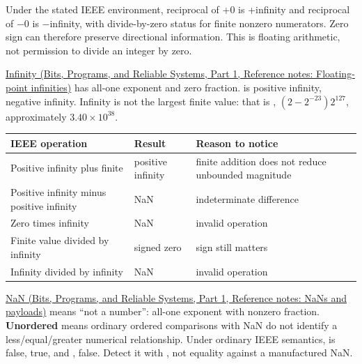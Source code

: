 Under the stated IEEE environment, reciprocal of +0 is +infinity and reciprocal of −0 is −infinity, with divide-by-zero status for finite nonzero numerators. Zero sign can therefore preserve directional information. This is floating arithmetic, not permission to divide an integer by zero.

\href{../01-Bits-Programs-and-Reliable-Systems-P01/main.pdf\#nameddest=appendix-eb336149c00a}{Infinity (Bits, Programs, and Reliable Systems, Part 1, Reference notes: Floating-point infinities)} has all-one exponent and zero fraction.  is positive infinity,  negative infinity. Infinity is not the largest finite value: that is , \((2-2^{-23})2^{127}\), approximately \(3.40\times10^{38}\).

{\def\LTcaptype{none} %
\begin{longtable}[]{@{}
  >{\raggedright\arraybackslash}p{}
  >{\raggedright\arraybackslash}p{}
  >{\raggedright\arraybackslash}p{}@{}}
\toprule\noalign{}
\begin{minipage}[b]{\linewidth}\raggedright
IEEE operation
\end{minipage} & \begin{minipage}[b]{\linewidth}\raggedright
Result
\end{minipage} & \begin{minipage}[b]{\linewidth}\raggedright
Reason to notice
\end{minipage} \\
\midrule\noalign{}
\endhead
\bottomrule\noalign{}
\endlastfoot
Positive infinity plus finite & positive infinity & finite addition does not reduce unbounded magnitude \\
Positive infinity minus positive infinity & NaN & indeterminate difference \\
Zero times infinity & NaN & invalid operation \\
Finite value divided by infinity & signed zero & sign still matters \\
Infinity divided by infinity & NaN & invalid operation \\
\end{longtable}
}

\href{../01-Bits-Programs-and-Reliable-Systems-P01/main.pdf\#nameddest=appendix-d6607cc4c235}{NaN (Bits, Programs, and Reliable Systems, Part 1, Reference notes: NaNs and payloads)} means ``not a number'': all-one exponent with nonzero fraction. \textbf{Unordered} means ordinary ordered comparisons with NaN do not identify a less/equal/greater numerical relationship. Under ordinary IEEE semantics,  is false,  true, and ,  false. Detect it with , not equality against a manufactured NaN.

